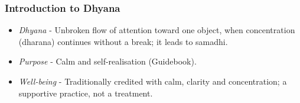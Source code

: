 


\begin{frame}[fragile]\frametitle{Introduction to Dhyana}
  \begin{itemize}
	\item \textit{Dhyana} - Unbroken flow of attention toward one object, when concentration (dharana) continues without a break; it leads to samadhi.
	\item \textit{Purpose} - Calm and self-realisation (Guidebook).
	\item \textit{Well-being} - Traditionally credited with calm, clarity and concentration; a supportive practice, not a treatment.
  \end{itemize}
\end{frame}